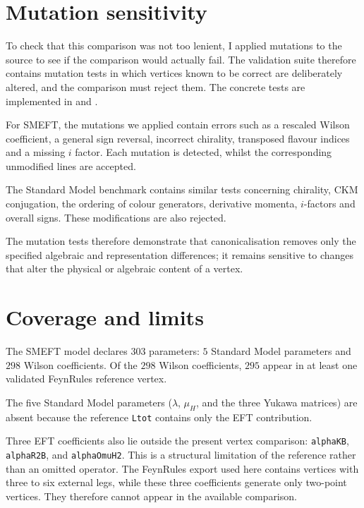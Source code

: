 \section{Mutation sensitivity}
\label{sec:validation-sensitivity}

To check that this comparison was not too lenient, I applied mutations to the source to see if the comparison would actually fail. The validation suite therefore contains mutation tests in which vertices known to be correct are deliberately altered, and the comparison must reject them. The concrete tests are implemented in  and .

For SMEFT, the mutations we applied contain errors such as a rescaled Wilson coefficient, a general sign reversal, incorrect chirality, transposed flavour indices and a missing $i$ factor. Each mutation is detected, whilst the corresponding unmodified lines are accepted.

The Standard Model benchmark contains similar tests concerning chirality, CKM conjugation, the ordering of colour generators, derivative momenta, $i$-factors and overall signs. These modifications are also rejected.

The mutation tests therefore demonstrate that canonicalisation removes only the specified algebraic and representation differences; it remains sensitive to changes that alter the physical or algebraic content of a vertex.


\section{Coverage and limits}
\label{sec:validation-coverage}

The SMEFT model declares $303$ parameters: $5$ Standard Model parameters and $298$ Wilson coefficients. Of the $298$ Wilson coefficients, $295$ appear in at least one validated FeynRules reference vertex.

The five Standard Model parameters ($\lambda$, $\mu_H$, and the three Yukawa matrices) are absent because the reference \texttt{Ltot} contains only the EFT contribution.

Three EFT coefficients also lie outside the present vertex comparison: \texttt{alphaKB}, \texttt{alphaR2B}, and \texttt{alphaOmuH2}. This is a structural limitation of the reference rather than an omitted operator. The FeynRules export used here contains vertices with three to six external legs, while these three coefficients generate only two-point vertices. They therefore cannot appear in the available comparison.

